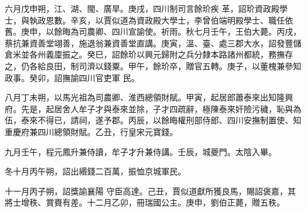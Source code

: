 \begin{pinyinscope}
 六月戊申朔，江、湖、閩、廣旱。庚戌，四川制司言餘玠疾
 革，詔玠資政殿學士，與執政恩數。辛亥，以賈似道為資政殿大學士，李曾伯端明殿學士、職任依舊。庚申，以餘晦為司農卿、四川宣諭使。祈雨。秋七月壬午，王伯大薨。丙戌，蔡抗兼資善堂翊善，施退翁兼資善堂直講。庚寅，溫、臺、處三郡大水，詔發豐儲倉米並各州義廩振之。癸巳，詔餘玠以興元歸附之兵分隸本路諸州都統，務撫存之，仍各給良田，制司濟以錢粟。甲午，餘玠卒，贈官五轉。庚子，以董槐兼參知政事。癸卯，詔撫諭四川官吏軍
 民。



 八月丁未朔，以馬光祖為司農卿、淮西總領財賦。甲寅，起居郎蕭泰來出知隆興府。先是，起居舍人牟子才與泰來並除，子才四疏辭，極陳泰來奸險污穢，恥與為伍，泰來不得已，請祠，遂予郡。丙辰，以餘晦權刑部侍郎、四川安撫制置使、知重慶府兼四川總領財賦。乙丑，行皇宋元寶錢。



 九月壬午，程元鳳升兼侍讀，牟子才升兼侍講。壬辰，城夔門。太陰入畢。



 冬十月丙午朔，詔出緡錢二百萬，振恤京城軍民。



 十一月丙子朔，詔獎諭襄陽
 守臣高達。己丑，賈似道獻所獲良馬，賜詔褒嘉，其將士增秩、賞賚有差。十二月乙卯，冊瑞國公主。庚申，劉伯正薨，贈五秩。



\end{pinyinscope}